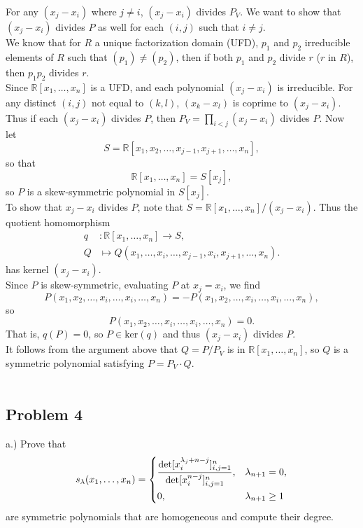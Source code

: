 \documentclass[12pt]{article}
\begin{document}
For any $(x_j - x_i)$ where $j \neq i$, $(x_j - x_i)$ divides $P_V$. 
We want to show that $(x_j - x_i)$ divides $P$ as well for each $(i,j)$ such that $i \neq j$.\\

We know that for $R$ a unique factorization domain (UFD), $p_1$ and $p_2$ irreducible elements of $R$ such that $(p_1) \neq (p_2)$, then if both $p_1$ and $p_2$ divide $r$ ($r$ in $R$), then $p_1p_2$ divides $r$.\\

Since $\mathbb{R}[x_1, \dots, x_n]$ is a UFD, and each polynomial $(x_j - x_i)$ is irreducible. For any distinct $(i, j)$ not equal to $(k, l)$, 
$(x_k - x_l)$ is coprime to $(x_j -x_i)$. Thus if each $(x_j-x_i)$ divides $P$, then $P_V = \prod_{i < j} (x_j - x_i)$ divides $P$. Now let
$$S = \mathbb{R}[x_1, x_2, \dots, x_{j-1}, x_{j+1} , \dots, x_n],$$
so that
$$\mathbb{R}[x_1, \dots, x_n] = S[x_j],$$
so $P$ is a skew-symmetric polynomial in $S[x_j]$.\\

To show that $x_j-x_i$ divides $P$, note that $S = \mathbb{R}[x_1,\dots,x_n]/(x_j-x_i)$. Thus the quotient homomorphism 
\begin{align*}
q &: \mathbb{R}[x_1,\dots,x_n] \longrightarrow S,\\
Q &\mapsto Q(x_1,\dots,x_i,\dots,x_{j-1},x_i,x_{j+1},\dots,x_n).
\end{align*}
has kernel $(x_j - x_i)$.\\

Since $P$ is skew-symmetric, evaluating $P$ at $x_j = x_i$, we find
$$P (x_1, x_2, \dots, x_i, \dots , x_i, \dots, x_n) 
= -P(x_1, x_2, \dots, x_i, \dots, x_i, \dots, x_n),$$
so
$$P(x_1, x_2, \dots, x_i, \dots, x_i, \dots, x_n) =  0.$$
That is, $q(P) = 0$, so $P\in \mathrm{ker}(q)$ and thus $(x_j - x_i)$  divides $P$.\\

It follows from the argument above that $Q = P/P_V$ is in $\mathbb{R}[x_1,\dots,x_n]$, so $Q$ is a symmetric polynomial satisfying $P = P_V\cdot Q$.\\\\

\subsection*{Problem 4}

a.) Prove that 
\[
s_\lambda(x_1,\dots,x_n) = \begin{dcases}
\frac{\det [x_i^{\lambda_j+n-j}]_{i,j=1}^n}{\det [x_i^{n-j}]_{i,j=1}^n}, & \lambda_{n+1}=0,\\
0, & \lambda_{n+1}\geq 1
\end{dcases}
\]
are symmetric polynomials that are homogeneous and compute their degree.\\ 
\end{document}
